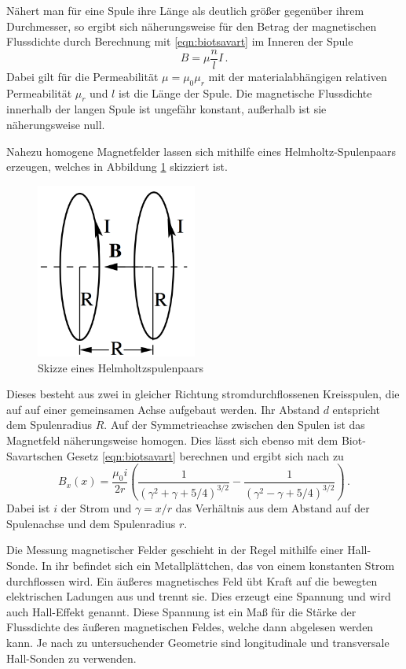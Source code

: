 Nähert man für eine Spule ihre Länge als deutlich größer gegenüber ihrem Durchmesser,
so ergibt sich näherungsweise für den Betrag der magnetischen Flussdichte durch Berechnung mit \eqref{eqn:biotsavart}
im Inneren der Spule
\begin{equation}
  B = \mu \frac{n}{l} I\,.
  \label{eqn:langespuleinnen}
\end{equation}
Dabei gilt für die Permeabilität $\mu = \mu_0 \mu_r$ mit der materialabhängigen
relativen Permeabilität $\mu_r$ und $l$ ist die Länge der Spule.
Die magnetische Flussdichte innerhalb der langen Spule ist ungefähr konstant, außerhalb
ist sie näherungsweise null.

Nahezu homogene Magnetfelder lassen sich mithilfe eines Helmholtz-Spulenpaars erzeugen, welches
in Abbildung \ref{fig:helmholtz} skizziert ist.

\begin{figure}
  \centering
  \includegraphics[width=150pt]{data/helmholtz.png}
  \caption{Skizze eines Helmholtzspulenpaars \cite{Versuchsanleitung}}
  \label{fig:helmholtz}
\end{figure}

Dieses besteht aus zwei in gleicher Richtung stromdurchflossenen Kreisspulen, die auf
auf einer gemeinsamen Achse aufgebaut werden. Ihr Abstand $d$ entspricht dem Spulenradius $R$.
Auf der Symmetrieachse zwischen den Spulen ist das Magnetfeld näherungsweise homogen. Dies lässt sich
ebenso mit dem Biot-Savartschen Gesetz \eqref{eqn:biotsavart} berechnen und ergibt sich nach \cite{Helmholtz} zu
\begin{equation}
  B_x(x) = \frac{\mu_0 i}{2 r} \left( \frac{1}{(\gamma^2+\gamma+5/4)^{3/2}} - \frac{1}{(\gamma^2-\gamma+5/4)^{3/2}} \right) \,.
  \label{eqn:helmholz}
\end{equation}
Dabei ist $i$ der Strom und $\gamma = x/r$ das Verhältnis aus dem Abstand auf der Spulenachse und dem Spulenradius $r$.

Die Messung magnetischer Felder geschieht in der Regel mithilfe einer Hall-Sonde.
In ihr befindet sich ein Metallplättchen, das von einem konstanten Strom durchflossen wird.
Ein äußeres magnetisches Feld übt Kraft auf die bewegten elektrischen Ladungen aus
und trennt sie. Dies erzeugt eine Spannung und wird auch Hall-Effekt genannt.
Diese Spannung ist ein Maß für die Stärke der Flussdichte des äußeren magnetischen Feldes, welche
dann abgelesen werden kann. Je nach zu untersuchender Geometrie sind longitudinale und transversale Hall-Sonden
zu verwenden.
